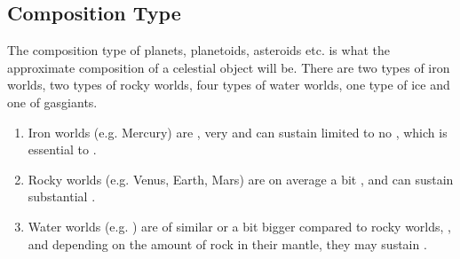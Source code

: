 \documentclass[letterpaper,10pt,english]{sphinxmanual}
\begin{document}
\subsection{Composition Type}
\label{\detokenize{quantities/material/composition_type:composition-type}}\label{\detokenize{quantities/material/composition_type::doc}}\label{\detokenize{quantities/material/composition_type:id1}}
\sphinxAtStartPar
The composition type of planets, planetoids, asteroids etc. is
what the approximate composition of a celestial object will be.
There are two types of iron worlds, two types of rocky worlds,
four types of water worlds, one type of ice\sphinxhyphen{} and one of gas\sphinxhyphen{}giants.
\begin{enumerate}
%
\item {} 
\sphinxAtStartPar
Iron worlds (e.g. Mercury) are {\hyperref[\detokenize{quantities/geometric/radius:id1}]{}}, very {\hyperref[\detokenize{quantities/material/density:id1}]{}} and can sustain limited to no {\hyperref[\detokenize{quantities/surface/internal_heating/tectonic_activity:id1}]{}}, which is essential to {\hyperref[\detokenize{quantities/habitability/habitability:id1}]{}}.

\item {} 
\sphinxAtStartPar
Rocky worlds (e.g. Venus, Earth, Mars) are on average a bit {\hyperref[\detokenize{quantities/geometric/radius:id1}]{}}, {\hyperref[\detokenize{quantities/material/density:id1}]{}} and can sustain substantial {\hyperref[\detokenize{quantities/surface/internal_heating/tectonic_activity:id1}]{}}.

\item {} 
\sphinxAtStartPar
Water worlds (e.g. ) are of similar {\hyperref[\detokenize{quantities/geometric/radius:id1}]{}} or a bit bigger compared to rocky worlds, {\hyperref[\detokenize{quantities/material/density:id1}]{}}, and depending on the amount of rock in their mantle, they may sustain {\hyperref[\detokenize{quantities/surface/internal_heating/tectonic_activity:id1}]{}}.


\end{enumerate}
\end{document}
